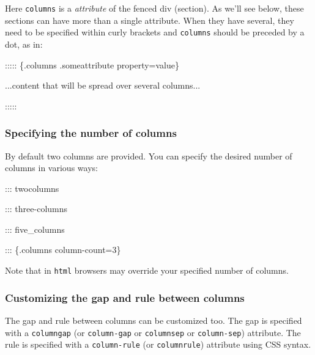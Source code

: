 \documentclass[
]{article}
\newenvironment{Shaded}{}{}
\newcommand{\NormalTok}[1]{#1}
\begin{document}
Here \texttt{columns} is a \emph{attribute} of the fenced div (section).
As we'll see below, these sections can have more than a single
attribute. When they have several, they need to be specified within
curly brackets and \texttt{columns} should be preceded by a dot, as in:

\begin{Shaded}
\begin{Highlighting}[]
\NormalTok{::::: \{.columns .someattribute property=value\}}

\NormalTok{...content that will be spread over several columns...}

\NormalTok{:::::}
\end{Highlighting}
\end{Shaded}

\hypertarget{specifying-the-number-of-columns}{%
\subsubsection{Specifying the number of
columns}\label{specifying-the-number-of-columns}}

By default two columns are provided. You can specify the desired number
of columns in various ways:

\begin{Shaded}
\begin{Highlighting}[]
\NormalTok{::: twocolumns}

\NormalTok{::: three{-}columns}

\NormalTok{::: five\_columns}

\NormalTok{::: \{.columns column{-}count=3\}}
\end{Highlighting}
\end{Shaded}

Note that in \texttt{html} browsers may override your specified number
of columns.

\hypertarget{customizing-the-gap-and-rule-between-columns}{%
\subsubsection{Customizing the gap and rule between
columns}\label{customizing-the-gap-and-rule-between-columns}}

The gap and rule between columns can be customized too. The gap is
specified with a \texttt{columngap} (or \texttt{column-gap} or
\texttt{columnsep} or \texttt{column-sep}) attribute. The rule is
specified with a \texttt{column-rule} (or \texttt{columnrule}) attribute
using CSS syntax.
\end{document}
